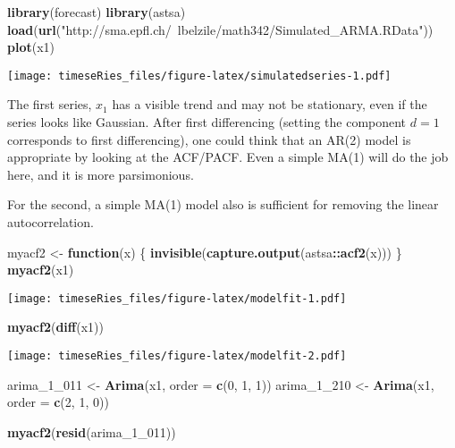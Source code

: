 \documentclass[]{book}
\newenvironment{Shaded}{\begin{snugshade}}{\end{snugshade}}
\newcommand{\ControlFlowTok}[1]{\textcolor[rgb]{0.13,0.29,0.53}{\textbf{#1}}}
\newcommand{\DataTypeTok}[1]{\textcolor[rgb]{0.13,0.29,0.53}{#1}}
\newcommand{\DecValTok}[1]{\textcolor[rgb]{0.00,0.00,0.81}{#1}}
\newcommand{\KeywordTok}[1]{\textcolor[rgb]{0.13,0.29,0.53}{\textbf{#1}}}
\newcommand{\NormalTok}[1]{#1}
\newcommand{\OperatorTok}[1]{\textcolor[rgb]{0.81,0.36,0.00}{\textbf{#1}}}
\newcommand{\StringTok}[1]{\textcolor[rgb]{0.31,0.60,0.02}{#1}}
\begin{document}
\begin{Shaded}
\begin{Highlighting}[]
\KeywordTok{library}\NormalTok{(forecast)}
\KeywordTok{library}\NormalTok{(astsa)}
\KeywordTok{load}\NormalTok{(}\KeywordTok{url}\NormalTok{(}\StringTok{"http://sma.epfl.ch/~lbelzile/math342/Simulated_ARMA.RData"}\NormalTok{))}
\KeywordTok{plot}\NormalTok{(x1)}
\end{Highlighting}
\end{Shaded}

\texttt{[image: timeseRies\_files/figure-latex/simulatedseries-1.pdf]}

The first series, \(x_1\) has a visible trend and may not be stationary,
even if the series looks like Gaussian. After first differencing
(setting the component \(d=1\) corresponds to first differencing), one
could think that an AR(2) model is appropriate by looking at the
ACF/PACF. Even a simple MA(1) will do the job here, and it is more
parsimonious.

For the second, a simple MA(1) model also is sufficient for removing the
linear autocorrelation.

\begin{Shaded}
\begin{Highlighting}[]
\NormalTok{myacf2 <-}\StringTok{ }\ControlFlowTok{function}\NormalTok{(x) \{}
    \KeywordTok{invisible}\NormalTok{(}\KeywordTok{capture.output}\NormalTok{(astsa}\OperatorTok{::}\KeywordTok{acf2}\NormalTok{(x)))}
\NormalTok{\}}
\KeywordTok{myacf2}\NormalTok{(x1)}
\end{Highlighting}
\end{Shaded}

\texttt{[image: timeseRies\_files/figure-latex/modelfit-1.pdf]}

\begin{Shaded}
\begin{Highlighting}[]
\KeywordTok{myacf2}\NormalTok{(}\KeywordTok{diff}\NormalTok{(x1))}
\end{Highlighting}
\end{Shaded}

\texttt{[image: timeseRies\_files/figure-latex/modelfit-2.pdf]}

\begin{Shaded}
\begin{Highlighting}[]
\NormalTok{arima_}\DecValTok{1}\NormalTok{_}\DecValTok{011}\NormalTok{ <-}\StringTok{ }\KeywordTok{Arima}\NormalTok{(x1, }\DataTypeTok{order =} \KeywordTok{c}\NormalTok{(}\DecValTok{0}\NormalTok{, }\DecValTok{1}\NormalTok{, }\DecValTok{1}\NormalTok{))}
\NormalTok{arima_}\DecValTok{1}\NormalTok{_}\DecValTok{210}\NormalTok{ <-}\StringTok{ }\KeywordTok{Arima}\NormalTok{(x1, }\DataTypeTok{order =} \KeywordTok{c}\NormalTok{(}\DecValTok{2}\NormalTok{, }\DecValTok{1}\NormalTok{, }\DecValTok{0}\NormalTok{))}

\KeywordTok{myacf2}\NormalTok{(}\KeywordTok{resid}\NormalTok{(arima_}\DecValTok{1}\NormalTok{_}\DecValTok{011}\NormalTok{))}
\end{Highlighting}
\end{Shaded}
\end{document}
